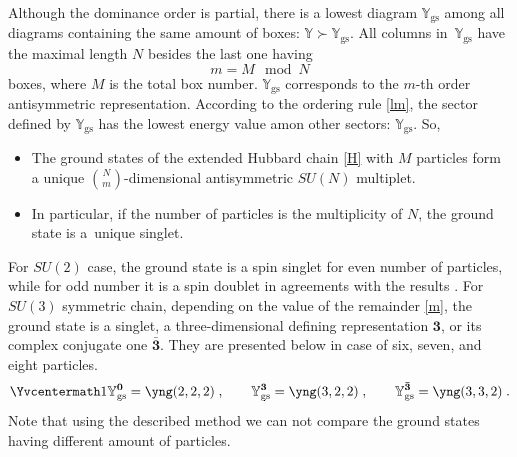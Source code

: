 \documentclass[pdftex]{sigma}
\newcommand{\yn}{\mathbb{Y}}
\newcommand{\yc}{\Yvcentermath1}
\begin{document}

Although the dominance order is partial, there is a lowest diagram $\yn_\text{gs}$
among all diagrams containing the same amount  of boxes: $\yn\succ\yn_\text{gs}$.
All columns in~$\yn_\text{gs}$  have the maximal length $N$ besides the last one having
\begin{equation}
\label{m}
m=M\mod{N}
\end{equation}
boxes, where $M$ is the total box number.    $\yn_\text{gs}$   corresponds to the $m$-th order
antisymmetric representation.
According to the ordering rule \eqref{lm}, the sector def\/ined by  $\yn_\text{gs}$   has
the lowest energy value amon other sectors:  $\yn_\text{gs}$. So,
\begin{itemize}\itemsep=0pt
\item
The ground states of the extended Hubbard chain \eqref{H} with $M$ particles form a unique
$\binom{N}{m}$-dimensional antisymmetric $SU(N)$ multiplet.
\item
In particular, if
the number of particles is the multiplicity of $N$, the ground state is a~unique
singlet.
\end{itemize}

For $SU(2)$ case, the ground state is a  spin singlet for even number of particles, while for odd
number it is a spin doublet in agreements with the results \cite{Amb92-2}.
For  $SU(3)$ symmetric chain, depending on the value of the remainder \eqref{m}, the ground state
is a singlet, a three-dimensional def\/ining representation $\mathbf{3}$, or its complex
conjugate one  $\mathbf{\bar{3}}$. They are presented below in case of six, seven,
and eight particles.
\begin{equation}
\label{su3}
{\yc
\yn_\text{gs}^\mathbf{0}=\yng(2,2,2)\;,
\qquad  \yn_\text{gs}^\mathbf{3}=\yng(3,2,2)\;,
\qquad  \yn_\text{gs}^\mathbf{\bar{3}}=\yng(3,3,2)\;.
}
\end{equation}
Note that using the described method we can not compare the ground states having
dif\/ferent  amount of particles.
\end{document}
